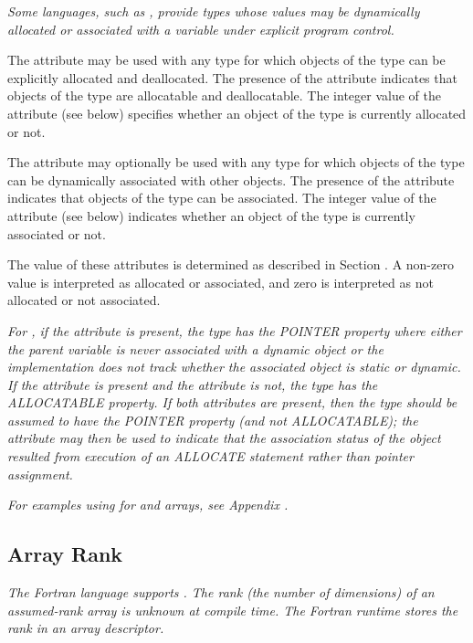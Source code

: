 {\textit{Some languages, such as ,
provide types whose values
may be dynamically allocated or associated with a variable
under explicit program control.}

The\hypertarget{chap:DWATallocatedallocationstatusoftypes}{}
\DWATallocatedDEFN{} attribute
may be used with any
type for which objects of the type can be explicitly allocated
and deallocated. The presence of the attribute indicates that
objects of the type are allocatable and deallocatable. The
integer value of the attribute (see below) specifies whether
an object of the type is currently allocated or not.

The\hypertarget{chap:DWATassociatedassociationstatusoftypes}{} 
\DWATassociatedDEFN{} attribute 
may 
optionally be used with
any type for which objects of the type can be dynamically
associated with other objects. The presence of the attribute
indicates that objects of the type can be associated. The
integer value of the attribute (see below) indicates whether
an object of the type is currently associated or not.

The value of these attributes is determined as described in
Section .
A non-zero value is interpreted as allocated or associated,
and zero is interpreted as not allocated or not associated.

\textit{For , 
if the \DWATassociated{} 
attribute is present,
the type has the POINTER property where either the parent
variable is never associated with a dynamic object or the
implementation does not track whether the associated object
is static or dynamic. If the \DWATallocated{} attribute is
present and the \DWATassociated{} attribute is not, the type
has the ALLOCATABLE property. If both attributes are present,
then the type should be assumed to have the POINTER property
(and not ALLOCATABLE); the \DWATallocated{} attribute may then
be used to indicate that the association status of the object
resulted from execution of an ALLOCATE statement rather than
pointer assignment.}

\textit{For examples using 
\DWATallocated{} for  and 
arrays, 
see Appendix .}

\subsection{Array Rank}
\label{chap:DWATrank}
\textit{The Fortran language supports . The
  rank (the number of dimensions) of an assumed-rank array is unknown
  at compile time. The Fortran runtime stores the rank in an array
  descriptor.}

}
